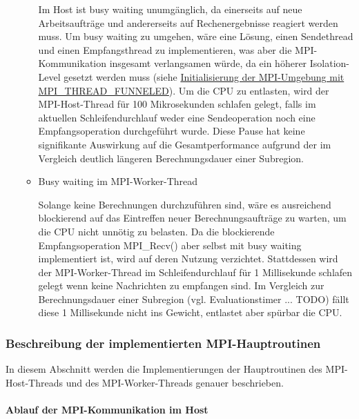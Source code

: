 \begin{itemize}
\begin{itemize}
		            Im Host ist busy waiting unumgänglich, da einerseits auf neue Arbeitsaufträge und andererseits auf Rechenergebnisse reagiert werden muss. Um busy waiting zu umgehen, wäre eine Lösung, einen Sendethread und einen Empfangsthread zu implementieren, was aber die MPI-Kommunikation insgesamt verlangsamen würde, da ein höherer Isolation-Level gesetzt werden muss (siehe \hyperref[item:mpi_init]{Initialisierung der MPI-Umgebung mit MPI\_THREAD\_FUNNELED}). Um die CPU zu entlasten, wird der MPI-Host-Thread für 100 Mikrosekunden schlafen gelegt, falls im aktuellen Schleifendurchlauf weder eine Sendeoperation noch eine Empfangsoperation durchgeführt wurde. Diese Pause hat keine signifikante Auswirkung auf die Gesamtperformance aufgrund der im Vergleich deutlich längeren Berechnungsdauer einer Subregion.

		      \item Busy waiting im MPI-Worker-Thread

		            Solange keine Berechnungen durchzuführen sind, wäre es ausreichend blockierend auf das Eintreffen neuer Berechnungsaufträge zu warten, um die CPU nicht unnötig zu belasten. Da die blockierende Empfangsoperation MPI\_Recv() aber selbst mit busy waiting implementiert ist, wird auf deren Nutzung verzichtet. Stattdessen wird der MPI-Worker-Thread im Schleifendurchlauf für 1 Millisekunde schlafen gelegt wenn keine Nachrichten zu empfangen sind. Im Vergleich zur Berechnungsdauer einer Subregion (vgl. Evaluationstimer ... TODO) fällt diese 1 Millisekunde nicht ins Gewicht, entlastet aber spürbar die CPU.

	      \end{itemize}

\end{itemize}

\subsubsection{Beschreibung der implementierten MPI-Hauptroutinen}

In diesem Abschnitt werden die Implementierungen der Hauptroutinen des MPI-Host-Threads und des MPI-Worker-Threads genauer beschrieben.

\paragraph{Ablauf der MPI-Kommunikation im Host}

